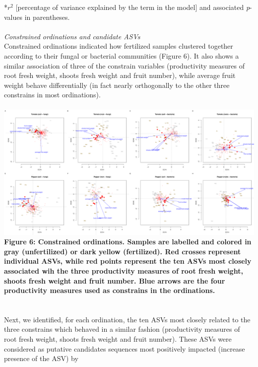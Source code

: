\documentclass[11pt,]{article}
\begin{document}
*\(r^2\) {[}percentage of variance explained by the term in the model{]}
and associated \emph{p}-values in parentheses. ~\\
\hspace*{0.333em}\\
\emph{Constrained ordinations and candidate ASVs}\\
Constrained ordinations indicated how fertilized samples clustered
together according to their fungal or bacterial communities (Figure 6).
It also shows a similar association of three of the constrain variables
(productivity measures of root fresh weight, shoots fresh weight and
fruit number), while average fruit weight behave differentially (in fact
nearly orthogonally to the other three constrains in most
ordinations).\\
\hspace*{0.333em}\\
\includegraphics{../figures/Figure6_rda.pdf}\\
\textbf{Figure 6: Constrained ordinations. Samples are labelled and
colored in gray (unfertilized) or dark yellow (fertilized). Red crosses
represent individual ASVs, while red points represent the ten ASVs most
closely associated wih the three productivity measures of root fresh
weight, shoots fresh weight and fruit number. Blue arrows are the four
productivity measures used as constrains in the ordinations.}\\
\hspace*{0.333em}\\
\hspace*{0.333em}\\
Next, we identified, for each ordination, the ten ASVs most closely
related to the three constrains which behaved in a similar fashion
(productivity measures of root fresh weight, shoots fresh weight and
fruit number). These ASVs were considered as putative candidates
sequences most positively impacted (increase presence of the ASV) by
\end{document}
